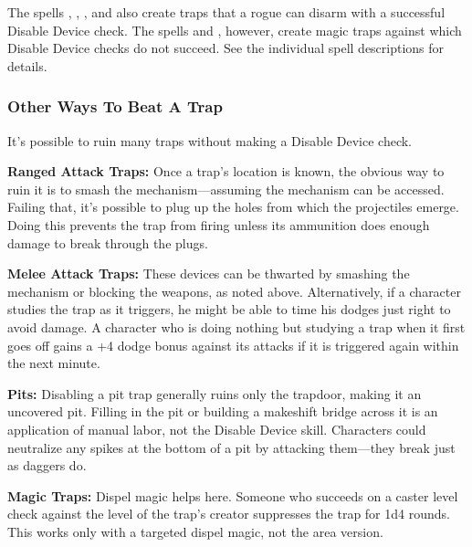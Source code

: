 The spells , , , and  also create traps that a rogue can disarm with a successful Disable Device check. The spells  and , however, create magic traps against which Disable Device checks do not succeed. See the individual spell descriptions for details.

\subsubsection{Other Ways To Beat A Trap}
It's possible to ruin many traps without making a Disable Device check.

\textbf{Ranged Attack Traps:} Once a trap's location is known, the obvious way to ruin it is to smash the mechanism---assuming the mechanism can be accessed. Failing that, it's possible to plug up the holes from which the projectiles emerge. Doing this prevents the trap from firing unless its ammunition does enough damage to break through the plugs.

\textbf{Melee Attack Traps:} These devices can be thwarted by smashing the mechanism or blocking the weapons, as noted above. Alternatively, if a character studies the trap as it triggers, he might be able to time his dodges just right to avoid damage. A character who is doing nothing but studying a trap when it first goes off gains a +4 dodge bonus against its attacks if it is triggered again within the next minute.

\textbf{Pits:} Disabling a pit trap generally ruins only the trapdoor, making it an uncovered pit. Filling in the pit or building a makeshift bridge across it is an application of manual labor, not the Disable Device skill. Characters could neutralize any spikes at the bottom of a pit by attacking them---they break just as daggers do.

\textbf{Magic Traps:} Dispel magic helps here. Someone who succeeds on a caster level check against the level of the trap's creator suppresses the trap for 1d4 rounds. This works only with a targeted dispel magic, not the area version.